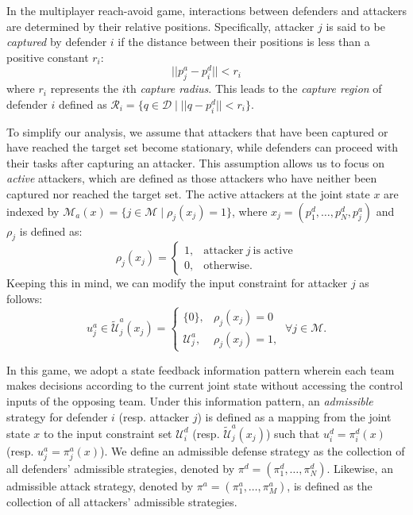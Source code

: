 \documentclass[journal]{IEEEtran}
\newcommand{\RR}{\mathcal{R}}
\newcommand{\D}{\mathcal{D}}
\newcommand{\M}{\mathcal{M}}
\newcommand{\U}{\mathcal{U}}
\newcommand{\1}{\mathbf{1}}
\begin{document}
In the multiplayer reach-avoid game, interactions between defenders and attackers are determined by their relative positions. Specifically, attacker $j$ is said to be \textit{captured} by defender $i$ if the distance between their positions is less than a positive constant $r_i$:
\begin{equation}\label{con:capture}
    ||p^a_j-p^d_i||<r_i
\end{equation}
where $r_i$ represents the $i$th \textit{capture radius}. This leads to the \textit{capture region} of defender $i$ defined as $\RR_i=\{q\in \D\mid ||q-p^d_i||<r_i\}$. 

To simplify our analysis, we assume that attackers that have been captured or have reached the target set become stationary, while defenders can proceed with their tasks after capturing an attacker. This assumption allows us to focus on \textit{active} attackers, which are defined as those attackers who have neither been captured nor reached the target set. The active attackers at the joint state $x$ are indexed by $\M_a(x)=\{j\in \M\mid \rho_j(x_j)=1\}$, where $x_j=(p^d_1,\ldots,p^d_N,p^a_j)$ and $\rho_j$ is defined as:
\begin{equation}\label{rho_j}
	\rho_j(x_j)=
	\begin{cases}
	    1, & \text{attacker}~j~\text{is active} \\
        0, & \text{otherwise}.
	\end{cases}
\end{equation}
Keeping this in mind, we can modify the input constraint for attacker $j$ as follows:
\begin{equation}\label{con:a_input'}
    u^a_j\in \tilde{\U}^a_j(x_j)=
    \begin{cases}
	    \{0\},&\rho_j(x_j)=0\\
	    \U^a_j,&\rho_j(x_j)=1,
	\end{cases}
~\forall j\in \M.
\end{equation}

In this game, we adopt a state feedback information pattern wherein each team makes decisions according to the current joint state without accessing the control inputs of the opposing team. Under this information pattern, an \textit{admissible} strategy for defender $i$ (resp. attacker $j$) is defined as a mapping from the joint state $x$ to the input constraint set $\U^d_i$ (resp. $\tilde{\U}^a_j(x_j)$) such that $u^d_i=\pi^d_i(x)$ (resp. $u^a_j=\pi^a_j(x)$). We define an admissible defense strategy as the collection of all defenders' admissible strategies, denoted by $\pi^d=(\pi^d_1,\ldots,\pi^d_N)$. Likewise, an admissible attack strategy, denoted by $\pi^a=(\pi^a_1,\ldots,\pi^a_M)$, is defined as the collection of all attackers' admissible strategies.
\end{document}
